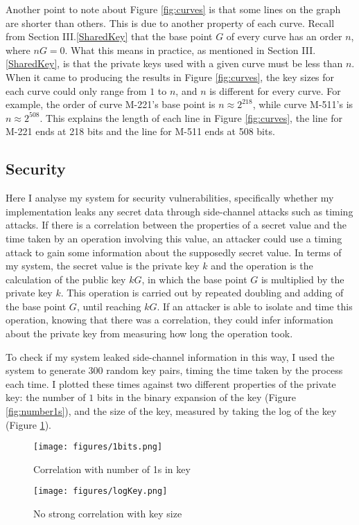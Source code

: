 \documentclass[12pt,a4paper]{article}
\begin{document}
Another point to note about Figure \ref{fig:curves} is that some lines on the graph are shorter than others. 
This is due to another property of each curve. 
Recall from Section III.\ref{SharedKey} that the base point $G$ of every curve has an order $n$, where $nG=0$. 
What this means in practice, as mentioned in Section III.\ref{SharedKey}, 
is that the private keys used with a given curve must be less than $n$. 
When it came to producing the results in Figure \ref{fig:curves}, the key sizes for each curve could only range from $1$ to $n$, 
and $n$ is different for every curve. 
For example, the order of curve M-221's base point is $n \approx 2^{218}$, while curve M-511's is $n \approx 2^{508}$. 
This explains the length of each line in Figure \ref{fig:curves}, the line for M-221 ends at 218 bits and the line for M-511 ends at 508 bits. 


\subsection{Security} \noindent \label{Security}
Here I analyse my system for security vulnerabilities, 
specifically whether my implementation leaks any secret data through side-channel attacks such as timing attacks. 
If there is a correlation between the properties of a secret value and the time taken by an operation involving this value, 
an attacker could use a timing attack to gain some information about the supposedly secret value. 
In terms of my system, the secret value is the private key $k$ and the operation is the calculation of the public key $kG$, 
in which the base point $G$ is multiplied by the private key $k$. 
This operation is carried out by repeated doubling and adding of the base point $G$, until reaching $kG$. 
If an attacker is able to isolate and time this operation, knowing that there was a correlation, 
they could infer information about the private key from measuring how long the operation took. 

To check if my system leaked side-channel information in this way, 
I used the system to generate 300 random key pairs, timing the time taken by the process each time. 
I plotted these times against two different properties of the private key: 
the number of $1$ bits in the binary expansion of the key (Figure \ref{fig:number1s}), 
and the size of the key, measured by taking the log of the key (Figure \ref{fig:logkey}). 

\begin{figure}[!htb]
    \begin{minipage}{0.5\textwidth}
        \centering
        \texttt{[image: figures/1bits.png]}
        \caption{Correlation with number of 1s in key}
        \label{fig:number1s}
    \end{minipage}\hfill
    \begin{minipage}{0.5\textwidth}
        \centering
        \texttt{[image: figures/logKey.png]}
        \caption{No strong correlation with key size}
        \label{fig:logkey}
    \end{minipage}
\end{figure}
\end{document}
